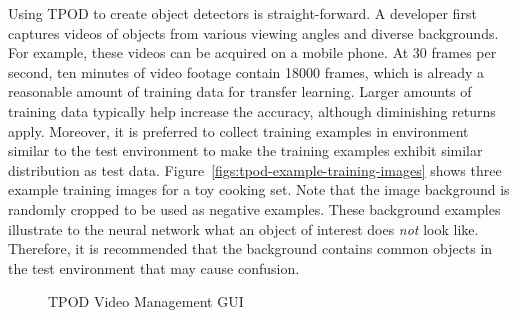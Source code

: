 Using TPOD to create object detectors is straight-forward. A developer first
captures videos of objects from various viewing angles and diverse backgrounds.
For example, these videos can be acquired on a mobile phone. At 30 frames per
second, ten minutes of video footage contain 18000 frames, which is already a
reasonable amount of training data for transfer learning. Larger amounts of
training data typically help increase the accuracy, although diminishing returns
apply. Moreover, it is preferred to collect training examples in environment
similar to the test environment to make the training examples exhibit similar
distribution as test data. Figure~\ref{figs:tpod-example-training-images} shows
three example training images for a toy cooking set. Note that the image
background is randomly cropped to be used as negative examples. These
background examples illustrate to the neural network what an object of interest
does \textit{not} look like. Therefore, it is recommended that the background contains
common objects in the test environment that may cause confusion.


\begin{figure}[]
  \centering
    \caption{TPOD Video Management GUI}
  \label{figs:tpod-video-gui}
\end{figure}


